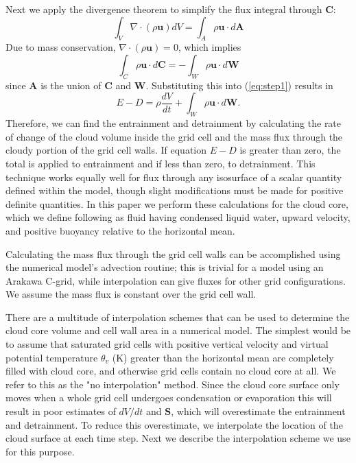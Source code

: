 \documentclass[12pt]{article}
\begin{document}
Next we apply the divergence theorem to simplify the flux integral through 
$\mathbf{C}$:
\begin{equation}
\label{eq:divergence} 
\int_{V} \nabla \cdot (\rho \mathbf{u}) dV = 
  \int_{A} \rho \mathbf{u}\cdot d\mathbf{A}
\end{equation}
Due to mass conservation, $\nabla \cdot (\rho \mathbf{u}) = 0$, which implies
\begin{equation}
\label{eq:divergence3} 
  \int_{C} \rho \mathbf{u}\cdot d\mathbf{C} = 
    - \int_{W} \rho \mathbf{u}\cdot d\mathbf{W}
\end{equation}
since $\mathbf{A}$ is the union of $\mathbf{C}$ and $\mathbf{W}$.  Substituting
this into (\ref{eq:step1}) results in
\begin{equation}
\label{eq:entrainment_detrainment} 
E - D = \rho \frac{dV}{dt} + \int_W \rho \mathbf{u} \cdot d\mathbf{W}.
\end{equation}
Therefore, we can find the entrainment and detrainment by calculating the rate 
of change of the cloud volume inside the grid cell and the mass flux through 
the cloudy portion of the grid cell walls.  If equation $E - D$ is greater than 
zero, the total is applied to entrainment and if less than zero, to 
detrainment.  This technique works equally well for flux through any isosurface 
of a scalar quantity defined within the model, though slight modifications must
be made for positive definite quantities.  In this paper we perform these 
calculations for the cloud core, which we define following \cite{Siebesma1995} 
as fluid having condensed liquid water, upward velocity, and positive buoyancy 
relative to the horizontal mean.  

Calculating the mass flux through the grid cell walls can be accomplished using 
the numerical model's advection routine; this is trivial for a model using an 
Arakawa C-grid, while interpolation can give fluxes for other grid 
configurations.  We assume the mass flux is constant over the grid cell wall.  

There are a multitude of interpolation schemes that can be used to determine 
the cloud core volume and cell wall area in a numerical model.  The simplest 
would be to assume that saturated grid cells with positive vertical velocity 
and virtual potential temperature $\theta_v$ (K) greater than the horizontal 
mean are completely filled with cloud core, and otherwise grid cells contain 
no cloud core at all.  We refer to this as the "no interpolation" method.  
Since the cloud core surface only moves when a whole grid cell undergoes 
condensation or evaporation this will result in poor estimates of $dV/dt$ and
$\mathbf{S}$, which will overestimate the entrainment and detrainment.  To 
reduce this overestimate, we interpolate the location of the cloud surface at 
each time step.  Next we describe the interpolation scheme we use for this 
purpose.
\end{document}
